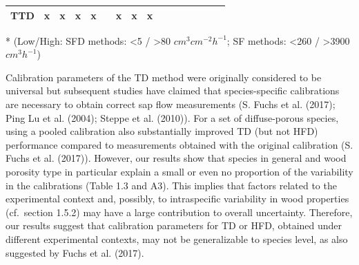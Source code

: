 \documentclass[11pt,twoside]{reedthesis}
\begin{document}
\begin{table}[!h]
\begin{threeparttable}
\begin{tabular}[t]{cccccccccccccccc}
TTD & x & x & x & x &  & x & x & x &  & \multicolumn{1}{c}{\cellcolor[HTML]{FFFFFF}{\textcolor[HTML]{FFFFFF}{0}}} & \multicolumn{1}{c}{\cellcolor[HTML]{FFFFFF}{\textcolor[HTML]{FFFFFF}{0}}} & \multicolumn{1}{c}{\cellcolor[HTML]{BBBBBB}{\textcolor[HTML]{BBBBBB}{1}}} & \multicolumn{1}{c}{\cellcolor[HTML]{FFFFFF}{\textcolor[HTML]{FFFFFF}{0}}} & \multicolumn{1}{c}{\cellcolor[HTML]{999999}{\textcolor[HTML]{999999}{2}}} & \multicolumn{1}{c}{\cellcolor[HTML]{FFFFFF}{\textcolor[HTML]{FFFFFF}{0}}}\\
\bottomrule
\end{tabular}
\begin{tablenotes}
\small
\item [*] (Low/High: SFD methods: <5 / >80 $cm^{3} cm^{-2} h^{-1}$; SF methods: <260 / >3900 $cm^3 h^{-1}$)
\end{tablenotes}
\end{threeparttable}
\end{table}
Calibration parameters of the TD method were originally considered to be
universal but subsequent studies have claimed that species-specific
calibrations are necessary to obtain correct sap flow measurements (S.
Fuchs et al. (2017); Ping Lu et al. (2004); Steppe et al. (2010)). For a
set of diffuse-porous species, using a pooled calibration also
substantially improved TD (but not HFD) performance compared to
measurements obtained with the original calibration (S. Fuchs et al.
(2017)). However, our results show that species in general and wood
porosity type in particular explain a small or even no proportion of the
variability in the calibrations (Table 1.3 and A3). This implies that
factors related to the experimental context and, possibly, to
intraspecific variability in wood properties (cf.~section 1.5.2) may
have a large contribution to overall uncertainty. Therefore, our results
suggest that calibration parameters for TD or HFD, obtained under
different experimental contexts, may not be generalizable to species
level, as also suggested by Fuchs et al. (2017).\par
\end{document}
